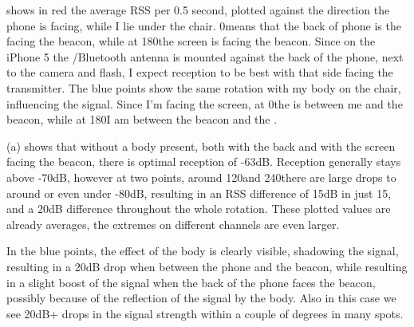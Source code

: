 
 shows in red the average RSS per 0.5 second, plotted against the direction the phone is facing, while I lie under the chair.
0\tdegree means that the back of phone is the facing the beacon, while at 180\tdegree the screen is facing the beacon.
Since on the iPhone 5 the \wifi/Bluetooth antenna is mounted against the back of the phone, next to the camera and flash, I expect reception to be best with that side facing the transmitter.
The blue points show the same rotation with my body on the chair, influencing the signal.
Since I'm facing the screen, at 0\tdegree the \device is between me and the beacon, while at 180\tdegree I am between the beacon and the \device.

(a) shows that without a body present, both with the back and with the screen facing the beacon, there is optimal reception of -63dB.
Reception generally stays above -70dB, however at two points, around 120\tdegree and 240\tdegree there are large drops to around or even under -80dB, resulting in an RSS difference of 15dB in just 15\tdegree, and a 20dB difference throughout the whole rotation.
These plotted values are already averages, the extremes on different channels are even larger.

In the blue points, the effect of the body is clearly visible, shadowing the signal, resulting in a 20dB drop when between the phone and the beacon, while resulting in a slight boost of the signal when the back of the phone faces the beacon, possibly because of the reflection of the signal by the body.
Also in this case we see 20dB+ drops in the signal strength within a couple of degrees in many spots.

